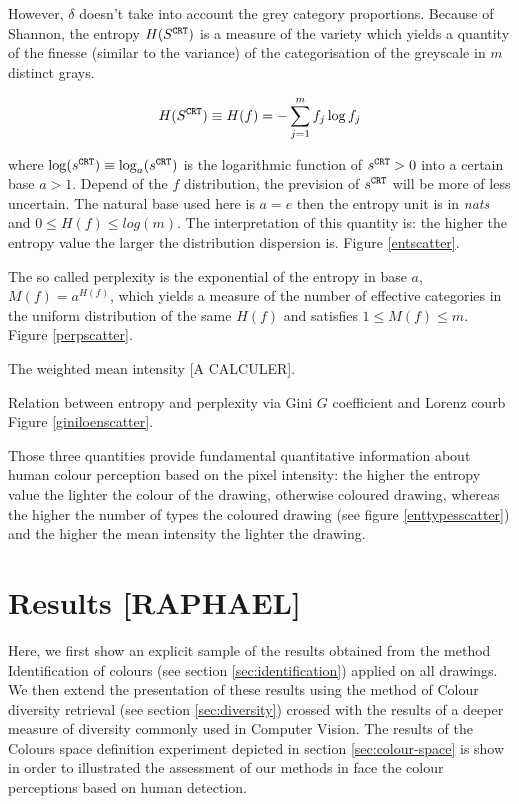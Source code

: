 \documentclass[11pt,a4paper]{article}
\begin{document}
However, \(\delta\) doesn't take into account the grey category
proportions. Because of Shannon, the entropy
\(H(S^{\tt \scriptstyle CRT})\) is a measure of the variety which yields
a quantity of the finesse (similar to the variance) of the
categorisation of the greyscale in \(m\) distinct grays.

\[ H(S^{\tt \scriptstyle CRT}) \equiv H(f) = -\sum_{j=1}^{m} f_j \log f_j \]

where
\(\log(s^{\tt \scriptstyle CRT}) \equiv \log_a(s^{\tt \scriptstyle CRT})\)
is the logarithmic function of \(s^{\tt \scriptstyle CRT} > 0\) into a
certain base \(a > 1\). Depend of the \(f\) distribution, the prevision
of \(s^{\tt \scriptstyle CRT}\) will be more of less uncertain. The
natural base used here is \(a = e\) then the entropy unit is in
\emph{nats} and \(0 \leq H(f) \leq log(m)\). The interpretation of this
quantity is: the higher the entropy value the larger the distribution
dispersion is. Figure \ref{entscatter}.

The so called perplexity is the exponential of the entropy in base
\(a\), \(M(f) = a^{H(f)}\), which yields a measure of the number of
effective categories in the uniform distribution of the same \(H(f)\)
and satisfies \(1 \leq M(f) \leq m\). Figure \ref{perpscatter}.

The weighted mean intensity {[}A CALCULER{]}.

Relation between entropy and perplexity via Gini \(G\) coefficient and
Lorenz courb Figure \ref{giniloenscatter}.

Those three quantities provide fundamental quantitative information
about human colour perception based on the pixel intensity: the higher
the entropy value the lighter the colour of the drawing, otherwise
coloured drawing, whereas the higher the number of types the coloured
drawing (see figure \ref{enttypesscatter}) and the higher the mean
intensity the lighter the drawing.



\section{Results [RAPHAEL]}

Here, we first show an explicit sample of the results obtained from the method Identification of colours (see section \ref{sec:identification}) applied on all drawings. We then extend the presentation of these results using the method of Colour diversity retrieval (see section \ref{sec:diversity}) crossed with the results of a deeper measure of diversity commonly used in Computer Vision. The results of the Colours space definition experiment depicted in section  \ref{sec:colour-space} is show in order to illustrated the assessment of our methods in face the colour perceptions based on human detection.
\end{document}
